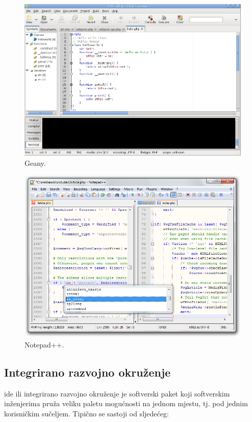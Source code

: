 \begin{figure}[!htbp]
    \caption{Geany.}
    \label{fig:geany}
    \centering
    \includegraphics[max width=\textwidth]{images/geany.png}
\end{figure}
\begin{figure}[!htbp]
    \caption{Notepad++.}
    \label{fig:notepadpp}
    \centering
    \includegraphics[max width=\textwidth]{images/notepadpp.png}
\end{figure}

\subsection{Integrirano razvojno okruženje}
\gls{ide} ili integrirano razvojno okruženje je softverski paket koji softverskim inženjerima pruža veliku paletu mogućnosti na jednom mjestu, tj. pod jednim korisničkim sučeljem. Tipično se sastoji od sljedećeg:

